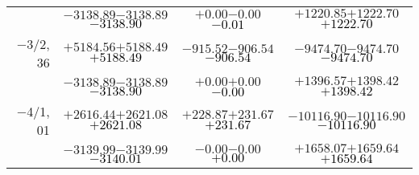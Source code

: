 \documentclass[compress]{beamer}
\begin{document}
\begin{frame}
{\begin{tabular}{r | c | c | c}
           & $-3138.89$\hspace{0.1 cm}$-3138.89$\hspace{0.1 cm}\textcolor{black}{$-3138.90$} & $+0.00$\hspace{0.1 cm}$-0.00$\hspace{0.1 cm}\textcolor{black}{$-0.01$} & $+1220.85$\hspace{0.1 cm}$+1222.70$\hspace{0.1 cm}\textcolor{black}{$+1222.70$} \\
$-$3/2, 36 & $+5184.56$\hspace{0.1 cm}$+5188.49$\hspace{0.1 cm}\textcolor{black}{$+5188.49$} & $-915.52$\hspace{0.1 cm}$-906.54$\hspace{0.1 cm}\textcolor{black}{$-906.54$} & $-9474.70$\hspace{0.1 cm}$-9474.70$\hspace{0.1 cm}\textcolor{black}{$-9474.70$} \\
           & $-3138.89$\hspace{0.1 cm}$-3138.89$\hspace{0.1 cm}\textcolor{black}{$-3138.90$} & $+0.00$\hspace{0.1 cm}$+0.00$\hspace{0.1 cm}\textcolor{black}{$-0.00$} & $+1396.57$\hspace{0.1 cm}$+1398.42$\hspace{0.1 cm}\textcolor{black}{$+1398.42$} \\
$-$4/1, 01 & $+2616.44$\hspace{0.1 cm}$+2621.08$\hspace{0.1 cm}\textcolor{black}{$+2621.08$} & $+228.87$\hspace{0.1 cm}$+231.67$\hspace{0.1 cm}\textcolor{black}{$+231.67$} & $-10116.90$\hspace{0.1 cm}$-10116.90$\hspace{0.1 cm}\textcolor{black}{$-10116.90$} \\
           & $-3139.99$\hspace{0.1 cm}$-3139.99$\hspace{0.1 cm}\textcolor{black}{$-3140.01$} & $-0.00$\hspace{0.1 cm}$-0.00$\hspace{0.1 cm}\textcolor{black}{$+0.00$} & $+1658.07$\hspace{0.1 cm}$+1659.64$\hspace{0.1 cm}\textcolor{black}{$+1659.64$} \\

\end{tabular}}
\end{frame}
\end{document}
